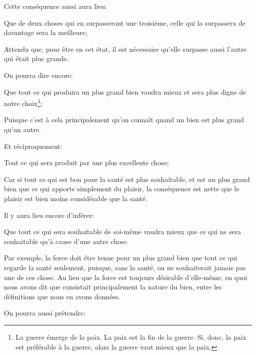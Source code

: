 \bigbreak

Cette conséquence aussi aura lieu:

\begin{lieu}
	Que de deux choses qui en surpasseront une troisième, celle qui la surpassera de davantage sera la
	meilleure;
\end{lieu}

Attendu que, pour être en cet état, il est nécessaire qu'elle surpasse aussi l'autre qui était plus grande.

\bigbreak

On pourra dire encore:

\begin{lieu}
	Que tout ce qui produira un plus grand bien vaudra mieux et sera plus digne de notre choix\footnote{La
	guerre émerge de la paix. La paix est la fin de la guerre. Si, donc, la paix est préférable à la guerre,
	alors la guerre vaut mieux que la paix.};
\end{lieu}
 
Puisque c'est à cela principalement qu'on connaît quand un bien est plus grand qu'un autre.

Et réciproquement:

\begin{lieu}
	Tout ce qui sera produit par une plus excellente chose;
\end{lieu}

Car si tout ce qui est bon pour la santé est plus souhaitable, et est un plus grand bien que ce qui apporte
simplement du plaisir, la conséquence est nette que le plaisir est bien moins considérable que la santé.

\bigbreak

Il y aura lieu encore d'inférer:

\begin{lieu}
	Que tout ce qui sera souhaitable de soi-même vaudra mieux que ce qui ne sera souhaitable qu'à cause d'une
	autre chose.
\end{lieu}
 
Par exemple, la force doit être tenue pour un plus grand bien que tout ce qui regarde la santé seulement, puisque,
sans la santé, on ne souhaiterait jamais pas une de ces chose. Au lieu que la force est toujours désirable d'elle-même,
en quoi nous avons dit que consistait principalement la nature du bien, entre les définitions que nous en avons données.

\bigbreak

On pourra aussi prétendre:

